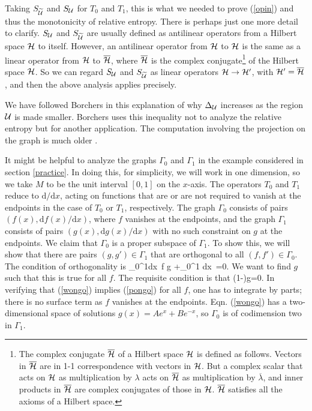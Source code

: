 \documentclass[12pt]{article}
\def\bar{\overline}
\numberwithin{equation}{section}
\def\d{\mathrm d}
\def\bar{\overline}
\def\bar{\overline}
\begin{document}
Taking $S_{\t\U}$ and $S_{{\mathcal U}}$ for $T_0$ and $T_1$, this is what we needed to prove (\ref{opin}) and thus the monotonicity of relative entropy.
There is perhaps just one more detail to clarify.   $S_{\mathcal U}$ and $S_{\t\U}$ are usually defined as antilinear operators from a Hilbert space
${\mathcal H}$ to itself.  However, an antilinear operator from ${\mathcal H}$ to ${\mathcal H}$ is the same as a linear operator from ${\mathcal H}$ to $\bar \H$, where $\bar \H$
is the complex conjugate\footnote{The complex conjugate $\bar\H$ of a Hilbert space ${\mathcal H}$ is defined as follows.
Vectors in $\bar\H$ are in 1-1 correspondence with vectors in ${\mathcal H}$.  But a complex scalar that acts on ${\mathcal H}$ as multiplication by $\lambda$
acts on $\bar\H$ as multiplication by $\bar\lambda$, and inner products in $\bar \H$ are complex conjugates of those in ${\mathcal H}$.
 $\bar\H$ satisfies all the axioms of a Hilbert space.}   of the Hilbert space ${\mathcal H}$.  So we can regard $S_{\mathcal U}$ and $S_{\t\U}$ as linear
operators ${\mathcal H}\to{\mathcal H}'$, with $\H'=\bar \H$, and then the above analysis applies precisely.



We have followed Borchers \cite{Borchers} in this explanation of why $\Delta_{\mathcal U}$ increases as the region ${\mathcal U}$ is made
smaller.  Borchers uses this inequality not to analyze the relative entropy but for another application. 
The computation involving the projection on the graph is much older \cite{Stone,Halmos}.  

It might be helpful to analyze the graphs $\Gamma_0$ and $\Gamma_1$ in the example considered in section \ref{practice}.   In doing this, for simplicity, we will work in one dimension, so we take $M$ to be the unit interval $[0,1]$ on the $x$-axis.
The operators $T_0$ and $T_1$ reduce to $\d/\d x$, acting on functions that are or are not required to vanish at the endpoints
in the case of $T_0$ or $T_1$, respectively.  The graph $\Gamma_0$ consists of pairs $(f(x), \d f(x)/\d x)$, where $f$ vanishes
at the endpoints, and the graph $\Gamma_1$ consists of pairs $(g(x),\d g(x)/\d x)$ with no such constraint on $g$ at the endpoints.
We claim that $\Gamma_0$ is a proper subspace of $\Gamma_1$.  To show this, we will show that there are pairs
$(g,g')\in\Gamma_1$ that are orthogonal to all $(f,f')\in\Gamma_0$.  The condition of orthogonality is
\be\label{pongo}\int_0^1\d x \,\bar f g +\int_0^1 \d x\, \frac{\d \bar f}{\d x}\frac{\d g}{\d x}=0.\ee
We want to find $g$ such that this is true for all $f$.  The requisite  condition is that 
\be\label{wongo} \left(1-\frac{\d^2}{\d x^2}\right)g=0. \ee
In verifying that (\ref{wongo}) implies (\ref{pongo}) for all $f$, one has to integrate by parts; there is no surface term as $f$ vanishes
at the endpoints.  Eqn. (\ref{wongo}) has a two-dimensional space of solutions $g(x)=Ae^x+Be^{-x}$, so $\Gamma_0$ is of
codimension two in $\Gamma_1$.
\end{document}
